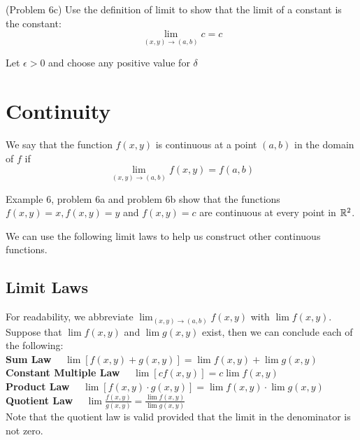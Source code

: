 \documentclass[handout]{ximera}
\begin{document}
\begin{problem}(Problem 6c)
Use the definition of limit to show that the limit of a constant is the constant:
\[
\lim_{(x,y) \to (a,b)} c = c
\]
\begin{hint}
Let $\epsilon >0$ and choose any positive value for $\delta$
\end{hint}
\end{problem}


\section{Continuity}

\begin{definition}[Continuity]
We say that the function $f(x,y)$ is continuous at a point $(a,b)$ in the domain of $f$ if
\[
\lim_{(x,y) \to (a,b)} f(x,y) = f(a,b)
\]
\end{definition}

Example 6, problem 6a and problem 6b show that the functions $f(x,y) = x, f(x,y) = y$ and $f(x,y) = c$ are continuous at every point in $\mathbb R^2$.

We can use the following limit laws to help us construct other continuous functions.

\subsection{Limit Laws}
For readability, we abbreviate $\lim_{(x,y) \to (a,b)} f(x,y)$ with $\lim f(x,y)$.\\

Suppose that $\lim f(x,y)$ and $\lim g(x,y)$ exist, then we can conclude each of the following:\\

\textbf{Sum Law} $\quad \displaystyle  \lim [f(x,y) + g(x,y)] = \lim f(x,y) +\lim g(x,y) $\\

\textbf{Constant Multiple Law} $\quad \displaystyle \lim[cf(x,y) ] = c\lim f(x,y) $\\

\textbf{Product Law} $\quad \displaystyle \lim[f(x,y) \cdot g(x,y)] = \lim f(x,y) \cdot \lim g(x,y)$\\ 
 
\textbf{Quotient Law} $\quad \displaystyle \lim \frac{f(x,y)}{g(x,y)} = \frac{\lim f(x,y)}{\lim g(x,y)} $\\

Note that the quotient law is valid provided that the limit in the denominator is not zero.
\end{document}
